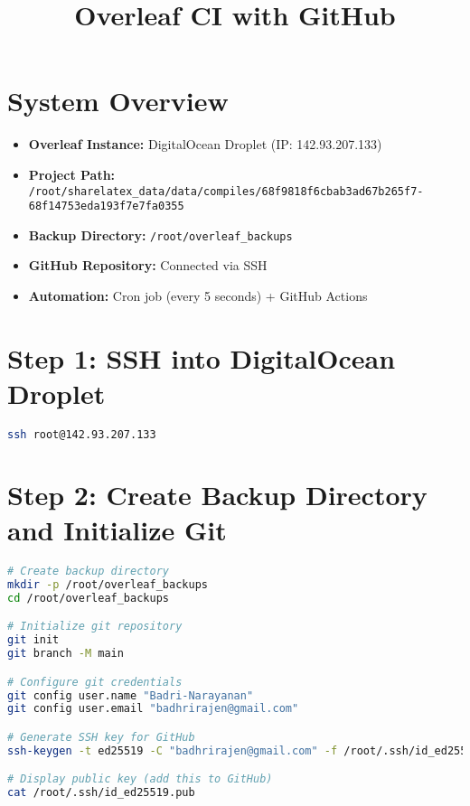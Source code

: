 
\title{Overleaf CI with GitHub}
\label{chap::overleafCI}



\maketitle
\tableofcontents
\newpage

\section{System Overview}

\begin{itemize}
    \item \textbf{Overleaf Instance:} DigitalOcean Droplet (IP: 142.93.207.133)
    \item \textbf{Project Path:} \texttt{/root/sharelatex\_data/data/compiles/68f9818f6cbab3ad67b265f7-68f14753eda193f7e7fa0355}
    \item \textbf{Backup Directory:} \texttt{/root/overleaf\_backups}
    \item \textbf{GitHub Repository:} Connected via SSH
    \item \textbf{Automation:} Cron job (every 5 seconds) + GitHub Actions
\end{itemize}

\section{Step 1: SSH into DigitalOcean Droplet}

\begin{lstlisting}[language=bash]
ssh root@142.93.207.133
\end{lstlisting}

\section{Step 2: Create Backup Directory and Initialize Git}

\begin{lstlisting}[language=bash]
# Create backup directory
mkdir -p /root/overleaf_backups
cd /root/overleaf_backups

# Initialize git repository
git init
git branch -M main

# Configure git credentials
git config user.name "Badri-Narayanan"
git config user.email "badhrirajen@gmail.com"

# Generate SSH key for GitHub
ssh-keygen -t ed25519 -C "badhrirajen@gmail.com" -f /root/.ssh/id_ed25519 -N ""

# Display public key (add this to GitHub)
cat /root/.ssh/id_ed25519.pub
\end{lstlisting}

